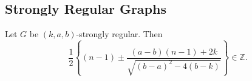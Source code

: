 \documentclass{article}
\begin{document}
\subsection{Strongly Regular Graphs}










































\begin{nthm}\label{thm:47}
    Let $G$ be $(k,a,b)$-strongly regular.
    Then
    \begin{equation*}
        \frac{1}{2} \left\{ (n-1) \pm \frac{(a-b)(n-1) + 2k}{\sqrt{(b-a)^2 - 4(b-k)}}\right\} \in \mathbb{Z}.
    \end{equation*}
\end{nthm}
\end{document}
